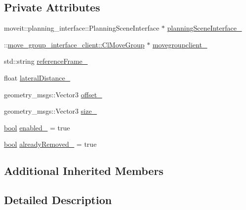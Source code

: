 \subsection*{Private Attributes}
\begin{DoxyCompactItemize}
\item 
moveit\+::planning\+\_\+interface\+::\+Planning\+Scene\+Interface $\ast$ \hyperlink{classsm__moveit__4_1_1move__group__interface__client_1_1CpConstraintLateralWorkspace_a4fc20ba3e0f44b4a85b1db67d3d6ce28}{planning\+Scene\+Interface\+\_\+}
\item 
\+::\hyperlink{classmove__group__interface__client_1_1ClMoveGroup}{move\+\_\+group\+\_\+interface\+\_\+client\+::\+Cl\+Move\+Group} $\ast$ \hyperlink{classsm__moveit__4_1_1move__group__interface__client_1_1CpConstraintLateralWorkspace_ab8a1340b115e80c9b5b4ece956a737dd}{movegroupclient\+\_\+}
\item 
std\+::string \hyperlink{classsm__moveit__4_1_1move__group__interface__client_1_1CpConstraintLateralWorkspace_ad295cea22a255b5181b75747a1c2de78}{reference\+Frame\+\_\+}
\item 
float \hyperlink{classsm__moveit__4_1_1move__group__interface__client_1_1CpConstraintLateralWorkspace_a7ecef38e94f47ca2a1a1ccd9994f7ac4}{lateral\+Distance\+\_\+}
\item 
geometry\+\_\+msgs\+::\+Vector3 \hyperlink{classsm__moveit__4_1_1move__group__interface__client_1_1CpConstraintLateralWorkspace_aeb3325a1b70163fbc32a6035a3b6c1a3}{offset\+\_\+}
\item 
geometry\+\_\+msgs\+::\+Vector3 \hyperlink{classsm__moveit__4_1_1move__group__interface__client_1_1CpConstraintLateralWorkspace_af029d4dd61252ad902e327c183c498d7}{size\+\_\+}
\item 
\hyperlink{classbool}{bool} \hyperlink{classsm__moveit__4_1_1move__group__interface__client_1_1CpConstraintLateralWorkspace_a7981810bd40955300bb7ba724361d4d7}{enabled\+\_\+} = true
\item 
\hyperlink{classbool}{bool} \hyperlink{classsm__moveit__4_1_1move__group__interface__client_1_1CpConstraintLateralWorkspace_af7cdd50e89bd65438ea95c509ba883a4}{already\+Removed\+\_\+} = true
\end{DoxyCompactItemize}
\subsection*{Additional Inherited Members}


\subsection{Detailed Description}


